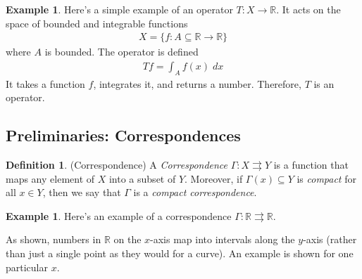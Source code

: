 \documentclass[12pt]{article}
\numberwithin{equation}{section} %
\theoremstyle{plain}
\theoremstyle{definition}
\newtheorem{defn}[thm]{Definition}
\newtheorem{ex}[thm]{Example}
\theoremstyle{remark}
\newcommand{\R}{\mathbb{R}}
\begin{document}
\begin{ex}
Here's a simple example of an operator $T:X\rightarrow \R$. It acts on
the space of bounded and integrable functions
\begin{align*}
  X = \{f: A\subseteq \R \rightarrow \R\}
\end{align*}
where $A$ is bounded.
The operator is defined
\begin{align*}
  Tf = \int_A f(x) \; dx
\end{align*}
It takes a function $f$, integrates it, and returns a number.
Therefore, $T$ is an operator.
\end{ex}

\subsection{Preliminaries: Correspondences}

\begin{defn}{(Correspondence)}
A \emph{Correspondence} $\Gamma:X\rightrightarrows Y$ is a function that
maps any element of $X$ into a subset of $Y$. Moreover, if
$\Gamma(x)\subseteq Y$ is \emph{compact} for all $x\in Y$, then we say
that $\Gamma$ is a \emph{compact correspondence}.
\end{defn}

\begin{ex}
Here's an example of a correspondence $\Gamma: \R\rightrightarrows\R$.
\begin{figure}[htpb!]
\centering
{}
\end{figure}

As shown, numbers in $\R$ on the $x$-axis map into intervals along the
$y$-axis (rather than just a single point as they would for a curve).
An example is shown for one particular $x$.
\end{ex}
\end{document}
